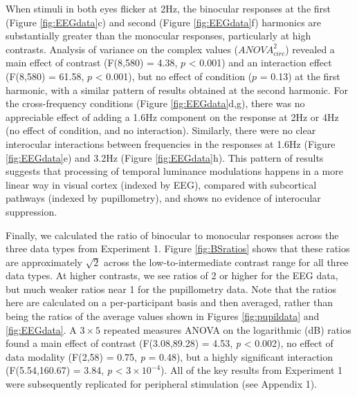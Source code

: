 \documentclass[
]{article}
\begin{document}
When stimuli in both eyes flicker at 2Hz, the binocular responses at the first (Figure \ref{fig:EEGdata}c) and second (Figure \ref{fig:EEGdata}f) harmonics are substantially greater than the monocular responses, particularly at high contrasts. Analysis of variance on the complex values (\(ANOVA^2_{circ}\)) revealed a main effect of contrast (F(8,580) = 4.38, \(p\) \textless{} 0.001) and an interaction effect (F(8,580) = 61.58, \(p\) \textless{} 0.001), but no effect of condition (\(p\) = 0.13) at the first harmonic, with a similar pattern of results obtained at the second harmonic. For the cross-frequency conditions (Figure \ref{fig:EEGdata}d,g), there was no appreciable effect of adding a 1.6Hz component on the response at 2Hz or 4Hz (no effect of condition, and no interaction). Similarly, there were no clear interocular interactions between frequencies in the responses at 1.6Hz (Figure \ref{fig:EEGdata}e) and 3.2Hz (Figure \ref{fig:EEGdata}h). This pattern of results suggests that processing of temporal luminance modulations happens in a more linear way in visual cortex (indexed by EEG), compared with subcortical pathways (indexed by pupillometry), and shows no evidence of interocular suppression.

Finally, we calculated the ratio of binocular to monocular responses across the three data types from Experiment 1. Figure \ref{fig:BSratios} shows that these ratios are approximately \(\sqrt2\) across the low-to-intermediate contrast range for all three data types. At higher contrasts, we see ratios of 2 or higher for the EEG data, but much weaker ratios near 1 for the pupillometry data. Note that the ratios here are calculated on a per-participant basis and then averaged, rather than being the ratios of the average values shown in Figures \ref{fig:pupildata} and \ref{fig:EEGdata}. A \(3 \times 5\) repeated measures ANOVA on the logarithmic (dB) ratios found a main effect of contrast (F(3.08,89.28) = 4.53, \emph{p} \textless{} 0.002), no effect of data modality (F(2,58) = 0.75, \emph{p} = 0.48), but a highly significant interaction (F(5.54,160.67) = 3.84, \emph{p} \textless{} \ensuremath{3\times 10^{-4}}). All of the key results from Experiment 1 were subsequently replicated for peripheral stimulation (see Appendix 1).
\end{document}
